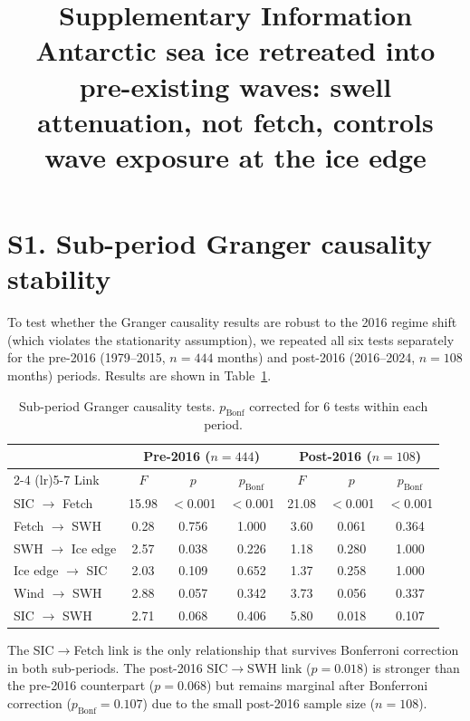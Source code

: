 \documentclass[11pt]{article}
\begin{document}
\title{Supplementary Information\\[6pt]
\large Antarctic sea ice retreated into pre-existing waves: swell attenuation, not fetch, controls wave exposure at the ice edge}
\author{}
\date{}
\maketitle

\section*{S1. Sub-period Granger causality stability}

To test whether the Granger causality results are robust to the 2016 regime shift (which violates the stationarity assumption), we repeated all six tests separately for the pre-2016 (1979--2015, $n = 444$ months) and post-2016 (2016--2024, $n = 108$ months) periods. Results are shown in Table~\ref{tab:subperiod}.

\begin{table}[htbp]
\centering
\caption{Sub-period Granger causality tests. $p_{\mathrm{Bonf}}$ corrected for 6 tests within each period.}
\label{tab:subperiod}
\begin{tabular}{lcccccc}
\toprule
 & \multicolumn{3}{c}{Pre-2016 ($n = 444$)} & \multicolumn{3}{c}{Post-2016 ($n = 108$)} \\
\cmidrule(lr){2-4} \cmidrule(lr){5-7}
Link & $F$ & $p$ & $p_{\mathrm{Bonf}}$ & $F$ & $p$ & $p_{\mathrm{Bonf}}$ \\
\midrule
SIC $\to$ Fetch & 15.98 & $<$0.001 & $<$0.001 & 21.08 & $<$0.001 & $<$0.001 \\
Fetch $\to$ SWH & 0.28 & 0.756 & 1.000 & 3.60 & 0.061 & 0.364 \\
SWH $\to$ Ice edge & 2.57 & 0.038 & 0.226 & 1.18 & 0.280 & 1.000 \\
Ice edge $\to$ SIC & 2.03 & 0.109 & 0.652 & 1.37 & 0.258 & 1.000 \\
Wind $\to$ SWH & 2.88 & 0.057 & 0.342 & 3.73 & 0.056 & 0.337 \\
SIC $\to$ SWH & 2.71 & 0.068 & 0.406 & 5.80 & 0.018 & 0.107 \\
\bottomrule
\end{tabular}
\end{table}

The SIC$\to$Fetch link is the only relationship that survives Bonferroni correction in both sub-periods. The post-2016 SIC$\to$SWH link ($p = 0.018$) is stronger than the pre-2016 counterpart ($p = 0.068$) but remains marginal after Bonferroni correction ($p_{\mathrm{Bonf}} = 0.107$) due to the small post-2016 sample size ($n = 108$).
\end{document}
